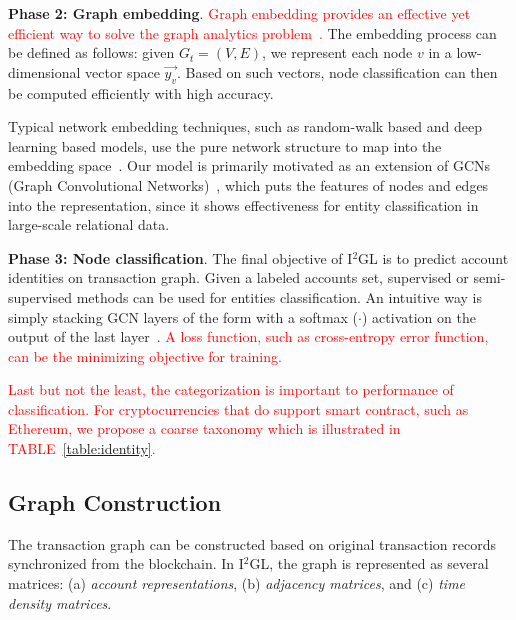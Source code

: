 \textbf{Phase 2: Graph embedding}.
\textcolor{red}{Graph embedding provides an effective yet efficient way to solve the graph analytics problem~\cite{cai2018comprehensive}.} The embedding process can be defined as follows: given $G_{t}=(V,E)$, we represent each node $v$ in a low-dimensional vector space $\vec{y_v}$. Based on such vectors, node classification can then be computed efficiently with high accuracy.

Typical network embedding techniques, such as random-walk based and deep learning based models, use the pure network structure to map into the embedding space~\cite{goyal2018capturing}. Our model is primarily motivated as an extension of GCNs (Graph Convolutional Networks)~\cite{kipf2016semi,schlichtkrull2018modeling}, which puts the features of nodes and edges into the representation, since it shows effectiveness for entity classification in large-scale relational data.


\textbf{Phase 3: Node classification}.
The final objective of I$^2$GL is to predict account identities on transaction graph. Given a labeled accounts set, supervised or semi-supervised methods can be used for entities classification. An intuitive way is simply stacking GCN layers of the form with a softmax ($\cdot$) activation on the output of the last layer~\cite{schlichtkrull2018modeling}. \textcolor{red}{A loss function, such as cross-entropy error function, can be the minimizing objective for training.}

\textcolor{red}{Last but not the least, the categorization is important to performance of classification. For cryptocurrencies that do support smart contract, such as Ethereum, we propose a coarse taxonomy which is illustrated in TABLE~\ref{table:identity}.} 


\subsection{Graph Construction}
The transaction graph can be constructed based on original transaction records synchronized from the blockchain. In I$^2$GL, the graph is represented as several matrices: (a) \emph{account representations}, (b) \emph{adjacency matrices}, and (c) \emph{time density matrices}.


